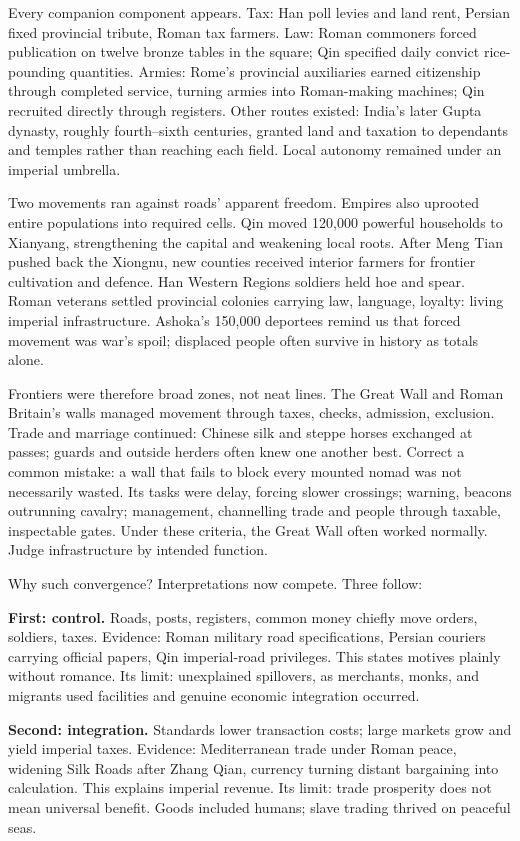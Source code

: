 Every companion component appears. Tax: Han poll levies and land rent, Persian fixed provincial tribute, Roman tax farmers. Law: Roman commoners forced publication on twelve bronze tables in the square; Qin specified daily convict rice-pounding quantities. Armies: Rome's provincial auxiliaries earned citizenship through completed service, turning armies into Roman-making machines; Qin recruited directly through registers. Other routes existed: India's later Gupta dynasty, roughly fourth--sixth centuries, granted land and taxation to dependants and temples rather than reaching each field. Local autonomy remained under an imperial umbrella.

Two movements ran against roads' apparent freedom. Empires also uprooted entire populations into required cells. Qin moved 120,000 powerful households to Xianyang, strengthening the capital and weakening local roots. After Meng Tian pushed back the Xiongnu, new counties received interior farmers for frontier cultivation and defence. Han Western Regions soldiers held hoe and spear. Roman veterans settled provincial colonies carrying law, language, loyalty: living imperial infrastructure. Ashoka's 150,000 deportees remind us that forced movement was war's spoil; displaced people often survive in history as totals alone.

Frontiers were therefore broad zones, not neat lines. The Great Wall and Roman Britain's walls managed movement through taxes, checks, admission, exclusion. Trade and marriage continued: Chinese silk and steppe horses exchanged at passes; guards and outside herders often knew one another best. Correct a common mistake: a wall that fails to block every mounted nomad was not necessarily wasted. Its tasks were delay, forcing slower crossings; warning, beacons outrunning cavalry; management, channelling trade and people through taxable, inspectable gates. Under these criteria, the Great Wall often worked normally. Judge infrastructure by intended function.

Why such convergence? Interpretations now compete. Three follow:

\textbf{First: control.} Roads, posts, registers, common money chiefly move orders, soldiers, taxes. Evidence: Roman military road specifications, Persian couriers carrying official papers, Qin imperial-road privileges. This states motives plainly without romance. Its limit: unexplained spillovers, as merchants, monks, and migrants used facilities and genuine economic integration occurred.

\textbf{Second: integration.} Standards lower transaction costs; large markets grow and yield imperial taxes. Evidence: Mediterranean trade under Roman peace, widening Silk Roads after Zhang Qian, currency turning distant bargaining into calculation. This explains imperial revenue. Its limit: trade prosperity does not mean universal benefit. Goods included humans; slave trading thrived on peaceful seas.

